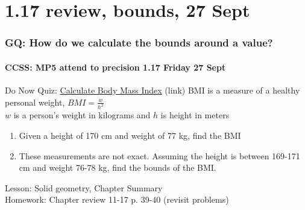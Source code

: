 \documentclass{beamer}
\begin{document}
  \section{1.17 review, bounds, 27 Sept}
  \frame
  {
    \frametitle{GQ: How do we calculate the bounds around a value?}
    \framesubtitle{CCSS: MP5 attend to precision \hfill \alert{1.17 Friday 27 Sept}}

    \begin{block}{Do Now Quiz: \href{https://www.smartbmicalculator.com/}{Calculate Body Mass Index} (link)}
      BMI is a measure of a healthy personal weight, $\displaystyle BMI = \frac{w}{h^2}$ \\ \smallskip
      $w$ is a person's weight in kilograms and $h$ is height in meters
      \begin{enumerate} 
          \item Given a height of 170 cm and weight of 77 kg, find the BMI
          \item These measurements are not exact. Assuming the height is between 169-171 cm and weight 76-78 kg, find the bounds of the BMI.
       \end{enumerate}
      \end{block}
    Lesson: Solid geometry, Chapter Summary\\ \smallskip
    Homework: Chapter review 11-17 p. 39-40 (revisit problems)
  }
\end{document}
